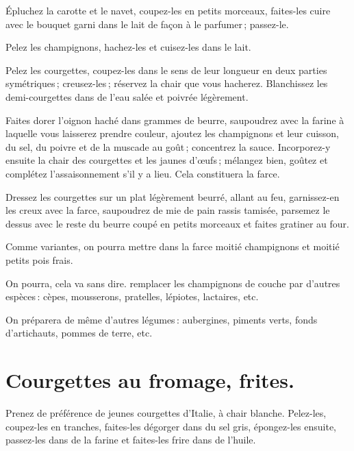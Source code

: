 Épluchez la carotte et le navet, coupez-les en petits morceaux, faites-les
cuire avec le bouquet garni dans le lait de façon à le parfumer ; passez-le.

Pelez les champignons, hachez-les et cuisez-les dans le lait.

Pelez les courgettes, coupez-les dans le sens de leur longueur en deux parties
symétriques ; creusez-les ; réservez la chair que vous hacherez. Blanchissez
les demi-courgettes dans de l’eau salée et poivrée légèrement.

Faites dorer l'oignon haché dans {\mmm} grammes de beurre, saupoudrez
avec la farine à laquelle vous laisserez prendre couleur, ajoutez les
champignons et leur cuisson, du sel, du poivre et de la muscade au goût ;
concentrez la sauce. Incorporez-y ensuite la chair des courgettes et les jaunes
d'œufs ; mélangez bien, goûtez et complétez l'assaisonnement s'il y a lieu.
Cela constituera la farce.

Dressez les courgettes sur un plat légèrement beurré, allant au feu,
garnissez-en les creux avec la farce, saupoudrez de mie de pain rassis tamisée,
parsemez le dessus avec le reste du beurre coupé en petits morceaux et faites
gratiner au four.

\sk

Comme variantes, on pourra mettre dans la farce moitié champignons et moitié
petits pois frais.

On pourra, cela va sans dire. remplacer les champignons de couche par d'autres
espèces : cèpes, mousserons, pratelles, lépiotes, lactaires, etc.

\sk

On préparera de même d'autres légumes : aubergines, piments verts, fonds
d'artichauts, pommes de terre, etc.

\section*{\centering Courgettes au fromage, frites.}
{}

Prenez de préférence de jeunes courgettes d'Italie, à chair blanche. Pelez-les,
coupez-les en tranches, faites-les dégorger dans du sel gris, épongez-les
ensuite, passez-les dans de la farine et faites-les frire dans de l'huile.

